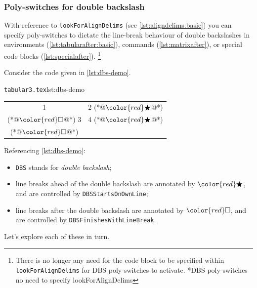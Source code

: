 \documentclass[10pt]{article}
\newcommand{\ElseStartsOnOwnLine}{\color{red}\bigstar}
\newcommand{\ElseFinishesWithLineBreak}{\color{red}\square}
\begin{document}
\subsubsection{Poly-switches for double backslash}\label{subsec:dbs}
 With reference to \texttt{lookForAlignDelims} (see \vref{lst:aligndelims:basic})
  you can specify poly-switches to
 dictate the line-break behaviour of double backslashes in environments
 (\vref{lst:tabularafter:basic}), commands (\vref{lst:matrixafter}), or special code
 blocks (\vref{lst:specialafter}). \footnote{There is no longer any need for the code
 block to be specified within \texttt{lookForAlignDelims} for DBS poly-switches to
 activate. *{DBS poly-switches no need to specify
 lookForAlignDelims}} 

 Consider the code given in \cref{lst:dbs-demo}.
 \begin{cmhlistings}[style=tcblatex,escapeinside={(*@}{@*)}]{\texttt{tabular3.tex}}{lst:dbs-demo}
\begin{tabular}{cc}
 1 & 2 (*@$\ElseStartsOnOwnLine$@*)\\(*@$\ElseFinishesWithLineBreak$@*) 3 & 4 (*@$\ElseStartsOnOwnLine$@*)\\(*@$\ElseFinishesWithLineBreak$@*)
\end{tabular}
\end{cmhlistings}
 Referencing \cref{lst:dbs-demo}:
 \begin{itemize}
  \item \texttt{DBS} stands for \emph{double backslash};
  \item line breaks ahead of the double backslash are annotated by
        $\ElseStartsOnOwnLine$, and are controlled by \texttt{DBSStartsOnOwnLine};
  \item line breaks after the double backslash are annotated by
        $\ElseFinishesWithLineBreak$, and are controlled by
        \texttt{DBSFinishesWithLineBreak}.
 \end{itemize}

 Let's explore each of these in turn.
\end{document}
